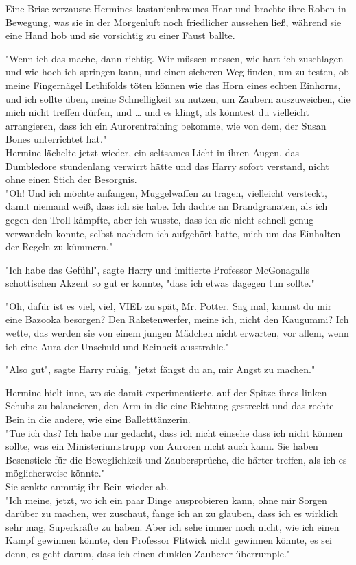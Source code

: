 {Eine Brise zerzauste Hermines kastanienbraunes Haar und brachte ihre Roben in Bewegung, was sie in der Morgenluft noch friedlicher aussehen ließ, während sie eine Hand hob und sie vorsichtig zu einer Faust ballte.

"Wenn ich das mache, dann richtig. Wir müssen messen, wie hart ich zuschlagen und wie hoch ich springen kann, und einen sicheren Weg finden, um zu testen, ob meine Fingernägel Lethifolds töten können wie das Horn eines echten Einhorns, und ich sollte üben, meine Schnelligkeit zu nutzen, um Zaubern auszuweichen, die mich nicht treffen dürfen, und … und es klingt, als könntest du vielleicht arrangieren, dass ich ein Aurorentraining bekomme, wie von dem, der Susan Bones unterrichtet hat."\\ Hermine lächelte jetzt wieder, ein seltsames Licht in ihren Augen, das Dumbledore stundenlang verwirrt hätte und das Harry sofort verstand, nicht ohne einen Stich der Besorgnis.\\ "Oh! Und ich möchte anfangen, Muggelwaffen zu tragen, vielleicht versteckt, damit niemand weiß, dass ich sie habe. Ich dachte an Brandgranaten, als ich gegen den Troll kämpfte, aber ich wusste, dass ich sie nicht schnell genug verwandeln konnte, selbst nachdem ich aufgehört hatte, mich um das Einhalten der Regeln zu kümmern."

"Ich habe das Gefühl", sagte Harry und imitierte Professor McGonagalls schottischen Akzent so gut er konnte, "dass ich etwas dagegen tun sollte."

"Oh, dafür ist es viel, viel, VIEL zu spät, Mr. Potter. Sag mal, kannst du mir eine Bazooka besorgen? Den Raketenwerfer, meine ich, nicht den Kaugummi? Ich wette, das werden sie von einem jungen Mädchen nicht erwarten, vor allem, wenn ich eine Aura der Unschuld und Reinheit ausstrahle."

"Also gut", sagte Harry ruhig, "jetzt fängst du an, mir Angst zu machen."

Hermine hielt inne, wo sie damit experimentierte, auf der Spitze ihres linken Schuhs zu balancieren, den Arm in die eine Richtung gestreckt und das rechte Bein in die andere, wie eine Balletttänzerin.\\ "Tue ich das? Ich habe nur gedacht, dass ich nicht einsehe dass ich nicht können sollte, was ein Ministeriumstrupp von Auroren nicht auch kann. Sie haben Besenstiele für die Beweglichkeit und Zaubersprüche, die härter treffen, als ich es möglicherweise könnte."\\ Sie senkte anmutig ihr Bein wieder ab.\\ "Ich meine, jetzt, wo ich ein paar Dinge ausprobieren kann, ohne mir Sorgen darüber zu machen, wer zuschaut, fange ich an zu glauben, dass ich es wirklich sehr mag, Superkräfte zu haben. Aber ich sehe immer noch nicht, wie ich einen Kampf gewinnen könnte, den Professor Flitwick nicht gewinnen könnte, es sei denn, es geht darum, dass ich einen dunklen Zauberer überrumple."

}
